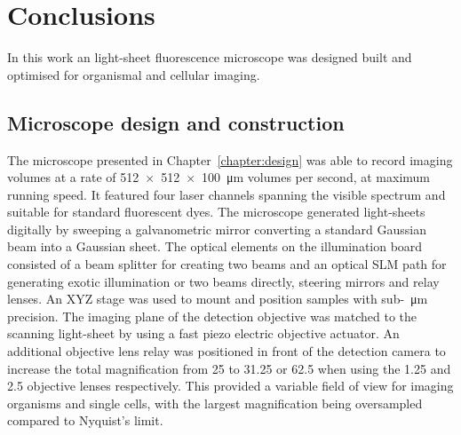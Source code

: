 \ifpdf
    \graphicspath{{Chapters/conclusions/Figs/Raster/}{Chapters/conclusions/Figs/PDF/}{Chapters/conclusions/Figs/}}
\else
    \graphicspath{{Chapters/conclusions/Figs/Vector/}{Chapters/conclusions/Figs/}}
\fi

\chapter{Conclusions}\label{chapter:conclusions}

In this work an \gls{light-sheet} fluorescence microscope was designed built and optimised for organismal and cellular imaging.

\section{Microscope design and construction}

The microscope presented in Chapter~\ref{chapter:design} was able to record imaging volumes at a rate of \SI{512x512x100}{\micro\meter} volumes per second, at maximum running speed.
It featured four laser channels spanning the visible spectrum and suitable for standard fluorescent dyes.
The microscope generated light-sheets digitally by sweeping a galvanometric mirror converting a standard Gaussian beam into a Gaussian sheet.
The optical elements on the \gls{illumination board} consisted of a beam splitter for creating two beams and an optical \gls{SLM} path for generating exotic illumination or two beams directly, steering mirrors and relay lenses.
An XYZ stage was used to mount and position samples with sub-\SI{}{\micro\meter} precision.
The imaging plane of the  detection objective was matched to the scanning light-sheet by using a fast piezo electric objective actuator.
An additional objective lens relay was positioned in front of the detection camera to increase the total magnification from \SI{25}{\times} to \SI{31.25}{\times} or \SI{62.5}{\times} when using the \SI{1.25}{\times} and \SI{2.5}{\times} objective lenses respectively.
This provided a variable field of view for imaging organisms and single cells, with the largest magnification being oversampled compared to Nyquist's limit.

